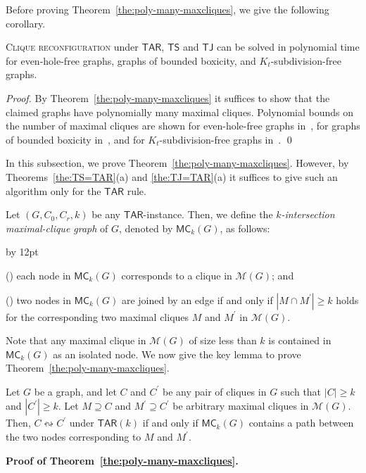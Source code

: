\documentclass{llncs}
\newcommand{\sevstep}{\leftrightsquigarrow}
\newcommand{\MC}[2]{\mathsf{MC}_{#1}(#2)}
\newcommand{\TAR}[1]{\mathsf{TAR}(#1)}
\newcommand{\TS}{\mathsf{TS}}
\newcommand{\TJ}{\mathsf{TJ}}
\newcommand{\ini}{0}
\newcommand{\tar}{r}
\newcommand{\cliq}{C}
\newcommand{\TARrule}{\mathsf{TAR}}
\newcommand{\Mset}[1]{\mathcal{M}(#1)}
\newenvironment{listing}[1]{\begin{list}{*}{\settowidth{\labelwidth}{#1}\setlength{\leftmargin}{\labelwidth}\advance \leftmargin by 12pt
\setlength{\itemsep}{0pt}\setlength{\parsep}{0pt}\setlength{\topsep}{0pt}\setlength{\parskip}{0pt}}}{\end{list}}
\newcounter{one}
\newcommand{\one}{{\rm \roman{one}}}
\newcounter{two}
\newcommand{\two}{{\rm \roman{two}}}
\begin{document}
	Before proving Theorem~\ref{the:poly-many-maxcliques}, we give the following corollary.
	\begin{corollary} \label{cor:maximal}
	\textsc{Clique reconfiguration} under $\TARrule$, $\TS$ and $\TJ$ can be solved in polynomial time for even-hole-free graphs, graphs of bounded boxicity, and $K_{t}$-subdivision-free graphs.
	\end{corollary}
	\begin{proof}
	By Theorem~\ref{the:poly-many-maxcliques} it suffices to show that the claimed graphs have polynomially many maximal cliques.
	Polynomial bounds on the number of maximal cliques are shown
for even-hole-free graphs in~\cite{SilvaV07},
for graphs of bounded boxicity in~\cite{Spinrad03},
and for $K_{t}$-subdivision-free graphs in~\cite{LeeO14}.
	\qed
	\end{proof}


	In this subsection, we prove Theorem~\ref{the:poly-many-maxcliques}. 
	However, by Theorems~\ref{the:TS=TAR}(a) and \ref{the:TJ=TAR}(a) it suffices to give such an algorithm only for the $\TARrule$ rule.

	Let $(G, \cliq_{\ini}, \cliq_{\tar}, k)$ be any $\TARrule$-instance.
	Then, we define the \emph{$k$-intersection maximal-clique graph} of $G$, denoted by $\MC{k}{G}$, as follows:
		\begin{listing}{aaa}
		\item[(\one)] each node in $\MC{k}{G}$ corresponds to a clique in $\Mset{G}$; and 
		\item[(\two)] two nodes in $\MC{k}{G}$ are joined by an edge if and only if $|M \cap M^\prime| \ge k$ holds for the corresponding two maximal cliques $M$ and $M^\prime$ in $\Mset{G}$.  
		\end{listing}
	Note that any maximal clique in $\Mset{G}$ of size less than $k$ is contained in $\MC{k}{G}$ as an isolated node.
	We now give the key lemma to prove Theorem~\ref{the:poly-many-maxcliques}.
	\begin{lemma} \label{lem:clique-path}
	Let $G$ be a graph, and let $\cliq$ and $\cliq^\prime$ be any pair of cliques in $G$ such that $|\cliq| \ge k$ and $|\cliq^\prime| \ge k$.
	Let $M \supseteq \cliq$ and $M^\prime \supseteq \cliq^\prime$ be arbitrary maximal cliques in $\Mset{G}$.
	Then, $\cliq \sevstep \cliq^\prime$ under $\TAR{k}$ if and only if $\MC{k}{G}$ contains a path between the two nodes corresponding to $M$ and $M^\prime$.
	\end{lemma}

	\noindent
	{\bf Proof of Theorem~\ref{the:poly-many-maxcliques}.}
\end{document}
